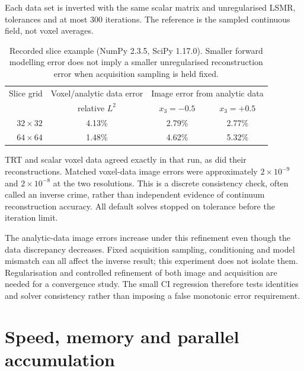 \documentclass[11pt,a4paper]{article}
\newcommand{\code}[1]{\texttt{\detokenize{#1}}}
\begin{document}
Each data set is inverted with the same scalar matrix and unregularised
LSMR, tolerances \code{atol=btol=1e-10} and at most 300 iterations. The
reference is the sampled continuous field, not voxel averages.
\begin{table}[htbp]
\centering\small
\begin{tabular}{@{}rccc@{}}
\toprule
Slice grid & Voxel/analytic data error & \multicolumn{2}{c}{Image error from analytic data}\\
 & relative $L^2$ & $x_3=-0.5$ & $x_3=+0.5$ \\
\midrule
$32\times32$ & 4.13\% & 2.79\% & 2.77\% \\
$64\times64$ & 1.48\% & 4.62\% & 5.32\% \\
\bottomrule
\end{tabular}
\caption{Recorded slice example (NumPy 2.3.5, SciPy 1.17.0).
Smaller forward modelling error does not imply a smaller unregularised
reconstruction error when acquisition sampling is held fixed.}
\end{table}

TRT and scalar voxel data agreed exactly in that run, as did their
reconstructions. Matched voxel-data image errors were approximately
$2\times10^{-9}$ and $2\times10^{-8}$ at the two resolutions. This is a
discrete consistency check, often called an inverse crime, rather than
independent evidence of continuum reconstruction accuracy. All default
solves stopped on tolerance before the iteration limit.

The analytic-data image errors increase under this refinement even though
the data discrepancy decreases. Fixed acquisition sampling, conditioning
and model mismatch can all affect the inverse result; this experiment does
not isolate them. Regularisation and controlled refinement of both image
and acquisition are needed for a convergence study. The small CI regression
therefore tests identities and solver consistency rather than imposing a
false monotonic error requirement.

\section{Speed, memory and parallel accumulation}
\label{sec:speed}
\end{document}
